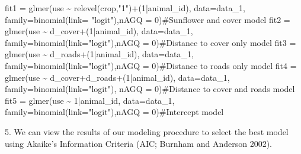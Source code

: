 \documentclass[
  letterpaper,
]{book}
\newenvironment{Shaded}{\begin{snugshade}}{\end{snugshade}}
\newcommand{\AttributeTok}[1]{\textcolor[rgb]{0.40,0.45,0.13}{#1}}
\newcommand{\CommentTok}[1]{\textcolor[rgb]{0.37,0.37,0.37}{#1}}
\newcommand{\DecValTok}[1]{\textcolor[rgb]{0.68,0.00,0.00}{#1}}
\newcommand{\FunctionTok}[1]{\textcolor[rgb]{0.28,0.35,0.67}{#1}}
\newcommand{\NormalTok}[1]{\textcolor[rgb]{0.00,0.23,0.31}{#1}}
\newcommand{\OtherTok}[1]{\textcolor[rgb]{0.00,0.23,0.31}{#1}}
\newcommand{\SpecialCharTok}[1]{\textcolor[rgb]{0.37,0.37,0.37}{#1}}
\newcommand{\StringTok}[1]{\textcolor[rgb]{0.13,0.47,0.30}{#1}}
\begin{document}
\begin{Shaded}
\begin{Highlighting}[]
\NormalTok{fit1 }\OtherTok{=} \FunctionTok{glmer}\NormalTok{(use }\SpecialCharTok{\textasciitilde{}} \FunctionTok{relevel}\NormalTok{(crop,}\StringTok{"1"}\NormalTok{)}\SpecialCharTok{+}\NormalTok{(}\DecValTok{1}\SpecialCharTok{|}\NormalTok{animal\_id), }\AttributeTok{data=}\NormalTok{data\_1, }\AttributeTok{family=}\FunctionTok{binomial}\NormalTok{(}\AttributeTok{link=}
  \StringTok{"logit"}\NormalTok{),}\AttributeTok{nAGQ =} \DecValTok{0}\NormalTok{)}\CommentTok{\#Sunflower and cover model}
\NormalTok{fit2 }\OtherTok{=} \FunctionTok{glmer}\NormalTok{(use }\SpecialCharTok{\textasciitilde{}}\NormalTok{ d\_cover}\SpecialCharTok{+}\NormalTok{(}\DecValTok{1}\SpecialCharTok{|}\NormalTok{animal\_id), }\AttributeTok{data=}\NormalTok{data\_1, }\AttributeTok{family=}\FunctionTok{binomial}\NormalTok{(}\AttributeTok{link=}\StringTok{"logit"}\NormalTok{),nAGQ}
  \OtherTok{=} \DecValTok{0}\NormalTok{)}\CommentTok{\#Distance to cover only model}
\NormalTok{fit3 }\OtherTok{=} \FunctionTok{glmer}\NormalTok{(use }\SpecialCharTok{\textasciitilde{}}\NormalTok{ d\_roads}\SpecialCharTok{+}\NormalTok{(}\DecValTok{1}\SpecialCharTok{|}\NormalTok{animal\_id), }\AttributeTok{data=}\NormalTok{data\_1, }\AttributeTok{family=}\FunctionTok{binomial}\NormalTok{(}\AttributeTok{link=}\StringTok{"logit"}\NormalTok{),nAGQ}
  \OtherTok{=} \DecValTok{0}\NormalTok{)}\CommentTok{\#Distance to roads only model}
\NormalTok{fit4 }\OtherTok{=} \FunctionTok{glmer}\NormalTok{(use }\SpecialCharTok{\textasciitilde{}}\NormalTok{ d\_cover}\SpecialCharTok{+}\NormalTok{d\_roads}\SpecialCharTok{+}\NormalTok{(}\DecValTok{1}\SpecialCharTok{|}\NormalTok{animal\_id), }\AttributeTok{data=}\NormalTok{data\_1, }\AttributeTok{family=}\FunctionTok{binomial}\NormalTok{(}\AttributeTok{link=}\StringTok{"logit"}\NormalTok{),}
  \AttributeTok{nAGQ =} \DecValTok{0}\NormalTok{)}\CommentTok{\#Distance to cover and roads model}
\NormalTok{fit5 }\OtherTok{=} \FunctionTok{glmer}\NormalTok{(use }\SpecialCharTok{\textasciitilde{}} \DecValTok{1}\SpecialCharTok{|}\NormalTok{animal\_id, }\AttributeTok{data=}\NormalTok{data\_1, }\AttributeTok{family=}\FunctionTok{binomial}\NormalTok{(}\AttributeTok{link=}\StringTok{"logit"}\NormalTok{),}\AttributeTok{nAGQ =} \DecValTok{0}\NormalTok{)}\CommentTok{\#Intercept model}
\end{Highlighting}
\end{Shaded}

5. We can view the results of our modeling procedure to select the best
model using Akaike's Information Criteria (AIC; Burnham and Anderson
2002).
\end{document}
